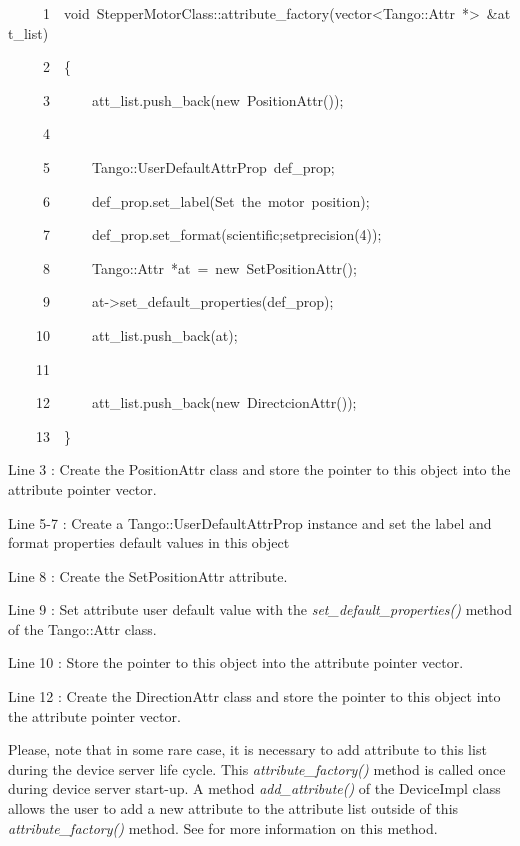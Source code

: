 
\begin{lyxcode}
~~~~~1~~void~StepperMotorClass::attribute\_factory(vector<Tango::Attr~{*}>~\&att\_list)

~~~~~2~~\{

~~~~~3~~~~~~att\_list.push\_back(new~PositionAttr());

~~~~~4~~

~~~~~5~~~~~~Tango::UserDefaultAttrProp~def\_prop;

~~~~~6~~~~~~def\_prop.set\_label(\textquotedbl{}Set~the~motor~position\textquotedbl{});

~~~~~7~~~~~~def\_prop.set\_format(\textquotedbl{}scientific;setprecision(4)\textquotedbl{});

~~~~~8~~~~~~Tango::Attr~{*}at~=~new~SetPositionAttr();

~~~~~9~~~~~~at->set\_default\_properties(def\_prop);

~~~~10~~~~~~att\_list.push\_back(at);

~~~~11~~

~~~~12~~~~~~att\_list.push\_back(new~DirectcionAttr());

~~~~13~~\}
\end{lyxcode}


Line 3 : Create the PositionAttr class and store the pointer to this
object into the attribute pointer vector.

Line 5-7 : Create a Tango::UserDefaultAttrProp instance and set the
label and format properties default values in this object

Line 8 : Create the SetPositionAttr attribute. 

Line 9 : Set attribute user default value with the \emph{set\_default\_properties()}
method of the Tango::Attr class.

Line 10 : Store the pointer to this object into the attribute pointer
vector.

Line 12 : Create the DirectionAttr class and store the pointer to
this object into the attribute pointer vector.

Please, note that in some rare case, it is necessary to add attribute
to this list during the device server life cycle. This \emph{attribute\_factory()}
method is called once during device server start-up. A method \emph{add\_attribute()}
of the DeviceImpl class allows the user to add a new attribute to
the attribute list outside of this \emph{attribute\_factory()} method.
See \cite{TANGO_ref_man} for more information on this method.


